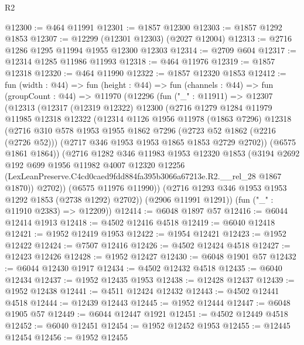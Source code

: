 \begin{lexlean}{R2}
\begin{coremodule}
@12300 := @464 @11991
@12301 := @1857 @12300
@12303 := @1857 @1292 @1853
@12307 := @12299 (@12301 @12303) (@2027 @12004)
@12313 := @2716 @1286 @1295 @11994 @1955 @12300 @12303
@12314 := @2709 @604
@12317 := @12314 @1285 @11986 @11993
@12318 := @464 @11976
@12319 := @1857 @12318
@12320 := @464 @11990
@12322 := @1857 @12320 @1853
@12412 := fun (width : @44) =>
  fun (height : @44) =>
  fun (channels : @44) =>
  fun (groupCount : @44) =>
  @11970
    (@12296
      (fun ("_" : @11911) =>
      @12307
        (@12313
          (@12317
            (@12319 @12322)
            @12300
            (@2716
              @1279
              @1284
              @11979
              @11985
              @12318
              @12322
              (@12314
                @1126
                @1956
                @11978
                (@1863 @7296)
                @12318
                (@2716
                  @310
                  @578
                  @1953
                  @1955
                  @1862
                  @7296
                  (@2723 @52 @1862 (@2216 (@2726 @52)))
                  (@2717 @346 @1953 @1953 @1865 @1853 @2729 @2702))
                (@6575 @1861 @1864))
              (@2716
                @1282
                @346
                @11983
                @1953
                @12320
                @1853
                (@3194
                  @2692
                  @192
                  @699
                  @1956
                  @11982
                  @4007
                  @12320
                  @12256
                  (LexLeanPreserve.C4cd0caed9fdd884fa395b3066a67213e.R2.__rel_28 @1867 @1870))
                @2702))
            (@6575 @11976 @11990))
          (@2716 @1293 @346 @1953 @1953 @1292 @1853 (@2738 @1292) @2702))
        (@2906 @11991 @1291))
      (fun ("_" : @11910 @2383) => @12209))
@12414 := @6048 @1897 @57
@12416 := @6044 @12414 @1913
@12418 := @4502 @12416 @4518
@12419 := @6040 @12418
@12421 := @1952 @12419 @1953
@12422 := @1954 @12421
@12423 := @1952 @12422
@12424 := @7507 @12416
@12426 := @4502 @12424 @4518
@12427 := @12423 @12426
@12428 := @1952 @12427
@12430 := @6048 @1901 @57
@12432 := @6044 @12430 @1917
@12434 := @4502 @12432 @4518
@12435 := @6040 @12434
@12437 := @1952 @12435 @1953
@12438 := @12428 @12437
@12439 := @1952 @12438
@12441 := @4511 @12424 @12432
@12443 := @4502 @12441 @4518
@12444 := @12439 @12443
@12445 := @1952 @12444
@12447 := @6048 @1905 @57
@12449 := @6044 @12447 @1921
@12451 := @4502 @12449 @4518
@12452 := @6040 @12451
@12454 := @1952 @12452 @1953
@12455 := @12445 @12454
@12456 := @1952 @12455

\end{coremodule}
\end{lexlean}
